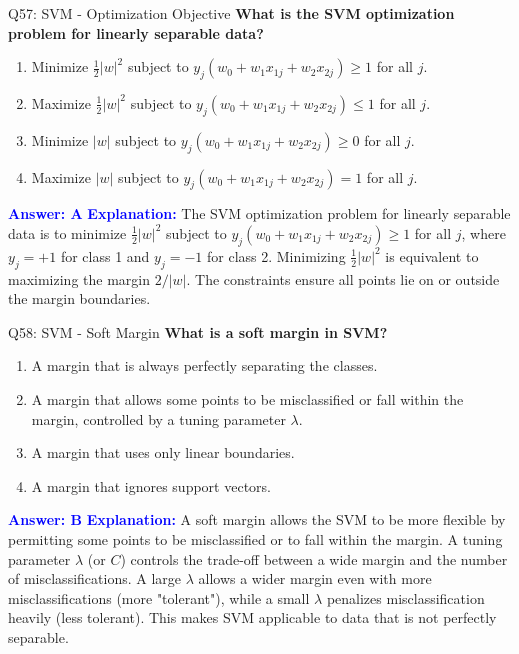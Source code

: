 \documentclass[8pt]{beamer}
\begin{document}
	\begin{frame}{Q57: SVM - Optimization Objective}
		\fontsize{6.5}{7.5}\selectfont
		\textbf{What is the SVM optimization problem for linearly separable data?}
		\begin{enumerate}
			\item Minimize $\frac{1}{2}|w|^2$ subject to $y_j(w_0 + w_1 x_{1j} + w_2 x_{2j}) \geq 1$ for all $j$.
			\item Maximize $\frac{1}{2}|w|^2$ subject to $y_j(w_0 + w_1 x_{1j} + w_2 x_{2j}) \leq 1$ for all $j$.
			\item Minimize $|w|$ subject to $y_j(w_0 + w_1 x_{1j} + w_2 x_{2j}) \geq 0$ for all $j$.
			\item Maximize $|w|$ subject to $y_j(w_0 + w_1 x_{1j} + w_2 x_{2j}) = 1$ for all $j$.
		\end{enumerate}
		\vspace{0.1cm}
		\textcolor{blue}{\textbf{Answer: A}}
		\vspace{0.1cm}
		\textcolor{blue}{\textbf{Explanation:}} The SVM optimization problem for linearly separable data is to minimize $\frac{1}{2}|w|^2$ subject to $y_j(w_0 + w_1 x_{1j} + w_2 x_{2j}) \geq 1$ for all $j$, where $y_j = +1$ for class 1 and $y_j = -1$ for class 2. Minimizing $\frac{1}{2}|w|^2$ is equivalent to maximizing the margin $2/|w|$. The constraints ensure all points lie on or outside the margin boundaries.
	\end{frame}
	
	\begin{frame}{Q58: SVM - Soft Margin}
		\fontsize{6.5}{7.5}\selectfont
		\textbf{What is a soft margin in SVM?}
		\begin{enumerate}
			\item A margin that is always perfectly separating the classes.
			\item A margin that allows some points to be misclassified or fall within the margin, controlled by a tuning parameter $\lambda$.
			\item A margin that uses only linear boundaries.
			\item A margin that ignores support vectors.
		\end{enumerate}
		\vspace{0.1cm}
		\textcolor{blue}{\textbf{Answer: B}}
		\vspace{0.1cm}
		\textcolor{blue}{\textbf{Explanation:}} A soft margin allows the SVM to be more flexible by permitting some points to be misclassified or to fall within the margin. A tuning parameter $\lambda$ (or $C$) controls the trade-off between a wide margin and the number of misclassifications. A large $\lambda$ allows a wider margin even with more misclassifications (more "tolerant"), while a small $\lambda$ penalizes misclassification heavily (less tolerant). This makes SVM applicable to data that is not perfectly separable.
	\end{frame}
	
\end{document}
